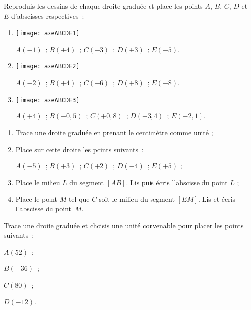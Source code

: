\begin{exercice}
Reproduis les dessins de chaque droite graduée et place les points $A$, $B$, $C$, $D$ et $E$ d'abscisses respectives :

\begin{enumerate}
  \item \begin{center} \texttt{[image: axeABCDE1]} \end{center}
  
 $A(- 1)$ ; $B(+4)$ ; $C(- 3)$ ; $D(+3)$ ; $E(- 5)$. \\[1em]
  \item \begin{center} \texttt{[image: axeABCDE2]} \end{center}
  
 $A(- 2)$ ; $B(+ 4)$ ; $C(- 6)$ ; $D(+ 8)$ ; $E(- 8)$. \\[1em]
  \item \begin{center} \texttt{[image: axeABCDE3]} \end{center}
  
 $A(+ 4)$ ; $B(- 0,5)$ ; $C(+ 0,8)$ ; $D(+ 3,4)$ ; $E(- 2,1)$.
 \end{enumerate}
\end{exercice}


\begin{exercice}
\begin{enumerate}
 \item Trace une droite graduée en prenant le centimètre comme unité ;
 \item Place sur cette droite les points suivants : 
 
$A(- 5)$ ; $B(+ 3)$ ; $C(+ 2)$ ; $D(- 4)$ ; $E(+ 5)$ ;
 \item Place le milieu $L$ du segment $[AB]$. Lis puis écris l'abscisse du point $L$ ;
 \item Place le point $M$ tel que $C$ soit le milieu du segment $[EM]$. Lis et écris l'abscisse du point $M$.
 \end{enumerate}
\end{exercice}


\begin{exercice}
Trace une droite graduée et choisis une unité convenable pour placer les points suivants :
\begin{colitemize}{4}
 \item $A(52)$ ;
 \item $B(- 36)$ ;
 \item $C(80)$ ;
 \item $D(- 12)$.
 \end{colitemize}
\end{exercice}


